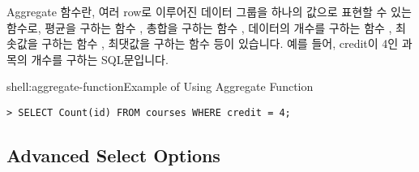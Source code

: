 Aggregate 함수란, 여러 row로 이루어진 데이터 그룹을 하나의 값으로 표현할 수 있는 함수로, 평균을 구하는 함수 , 총합을 구하는 함수 , 데이터의 개수를 구하는 함수 , 최솟값을 구하는 함수 , 최댓값을 구하는 함수  등이 있습니다. 예를 들어, \은 credit이 4인 과목의 개수를 구하는 SQL문입니다.

\begin{shellenv}{shell:aggregate-function}{Example of Using Aggregate Function}\begin{verbatim}
> SELECT Count(id) FROM courses WHERE credit = 4;
\end{verbatim}
\end{shellenv}

\subsection*{Advanced Select Options}

